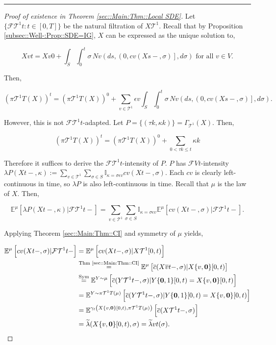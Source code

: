 \documentclass[12pt]{article}
\newcommand{\mb}{\mathbb}
\newcommand{\mc}{\mathcal}
\newcommand{\ov}{\overline}
\newcommand{\os}{\overset}
\newcommand{\te}{\text}
\newcommand{\ep}{\epsilon}
\newcommand{\lin}{\rule{\linewidth}{0.4 pt}}
\newcommand{\exmu}[2]{\mb{E}^{#1}\left[#2\right]}	%
\renewcommand{\root}{\mathbf{0}}				%
\renewcommand{\v}{v}							%
\renewcommand{\S}{S}							%
\newcommand{\s}{\sigma}							%
\newcommand{\ev}{\ep}							%
\newcommand{\T}{T}								%
\renewcommand{\t}{t}							%
\newcommand{\proj}{\pi}							%
\renewcommand{\tt}{s}							%
\newcommand{\F}{\mc{F}}							%
\newcommand{\X}{X}								%
\newcommand{\IGr}{c}							%
\newcommand{\cl}{\ov}							%
\newcommand{\IGrg}{\ov{c}}						%
\newcommand{\tree}{\mc{T}}						%
\newcommand{\sln}[1]{^{#1}}						%
\newcommand{\poiss}{N}							%
\newcommand{\rate}{\lambda}						%
\newcommand{\alt}[1]{\widetilde{#1}}			%
\newcommand{\m}{\mu}							%
\newcommand{\cm}{\gamma}						%
\newcommand{\XX}{Y}								%
\newcommand{\rt}{\tau}							%
\renewcommand{\it}{k}							%
\newcommand{\pmap}[1]{\Gamma_{#1}}				%
\renewcommand{\mark}{\kappa}					%
\newcommand{\rp}{P}								%
\newcommand{\crate}{\alt{\lambda}}				%
\begin{document}
\lin

\begin{proof}[Proof of existence in Theorem \ref{sec::Main:Thm::Local SDE}]

Let \(\{\F{\tree\sln{1}}{\t}:\t\in [0,\T]\}\) be the natural filtration of \(\X{\tree\sln{1}}{}\). Recall that by Proposition \ref{subsec::Well-:Prop::SDE=IG}, \(\X{}{}\) can be expressed as the unique solution to,

\[\X{\v}{\t} = \X{\v}{0} + \int_\S\int_0^\t \s\,\poiss{\v}\left(d\tt,\left(0,c{\v}(\X{}{\tt-},\s)\right],d\s\right) \te{ for all } \v \in  V.\]

Then,

\[\left(\proj{\tree\sln{1}}{\T}(\X{}{})\right)^\t = \left(\proj{\tree\sln{1}}{\T}(\X{}{})\right)^0 + \sum_{\v \in \tree\sln{1}}\ev{\v}\int_\S\int_0^\t \s\,\poiss{\v}\left(d\tt,\left(0,\IGr{\v}(\X{}{\tt-},\s)\right],d\s\right).\]

However, this is not \(\F{\tree\sln{1}}{\t}\)-adapted. Let \(\rp{} = \{(\rt{\it},\mark{\it})\} = \pmap{\tree\sln{1}}(\X{}{}).\) Then,

\[\left(\proj{\tree\sln{1}}{\T}(\X{}{})\right)^\t = \left(\proj{\tree\sln{1}}{\T}(\X{}{})\right)^0 + \sum_{0 < \rt{\it} \leq t}\mark{\it}\]

Therefore it suffices to derive the \(\F{\tree\sln{1}}{\t}\)-intensity of \(\rp{}\). \(\rp{}\) has \(\F{ V}{\t}\)-intensity \(\rate{\rp{}}(\X{}{\t-},\mark{}) := \sum_{\v \in \tree^1}\sum_{\s\in S}\mb{I}_{\mark{} = \s\ev{\v}}\IGr{\v}(\X{}{\t-},\s)\). Each \(\IGr{\v}\) is clearly left-continuous in time, so \(\rate{\rp{}}\) is also left-continuous in time. Recall that \(\m{}{}{}\) is the law of \(\X{}{}\). Then,

\[\exmu{\m{}{}{}}{\rate{\rp{}}(\X{}{\t-},\mark{})|\F{\tree\sln{1}}{\t-}} = \sum_{\v \in \tree\sln{1}}\sum_{\s\in S} \mb{I}_{\mark{} = \s\ev{\v}}\exmu{\m{}{}{}}{\IGr{\v}(\X{}{\t-},\s)|\F{\tree\sln{1}}{\t-}}.\]

Applying Theorem \ref{sec::Main:Thm::CI} and symmetry of \(\m{}{}{}\) yields,

\begin{align*}
\exmu{\m{}{}{}}{\IGr{\v}(\X{}{\t-},\s)|\F{\tree\sln{1}}{\t-}} &= \exmu{\m{}{}{}}{\IGr{\v}(\X{}{\t-},\s)|\X{\tree\sln{1}}{[0,\t)}}\\
&\os{\te{Thm \ref{sec::Main:Thm::CI}}}{=} \exmu{\m{}{}{}}{\IGrg{}(\X{\cl{\v}}{\t-},\s)|\X{\{\v,\root\}}{[0,\t)}} \\
&\os{\te{Sym}}{=} \exmu{\XX{}{}\sim \m{}{}{}}{\IGrg{}(\XX{\tree\sln{1}}{\t-},\s)|\XX{\{\root,1\}}{[0,\t)} = \X{\{\v,\root\}}{[0,\t)}}\\
&= \exmu{\XX{}{}\sim \proj{\tree\sln{1}}{\T}(\m{}{}{})}{\IGrg{}(\XX{\tree\sln{1}}{\t-},\s)|\XX{\{\root,1\}}{[0,\t)} = \X{\{\v,\root\}}{[0,\t)}}\\
&= \exmu{\cm_\t\left(\X{\{\v,\root\}}{[0,\t)},\proj{\tree\sln{1}}{\T}(\m{}{}{})\right)}{\IGrg{}(\X{\tree\sln{1}}{\t-},\s)}\\
&=\crate{}{}(\X{\{\v,\root\}}{[0,\t)},\s) = \crate{\v}{\t}(\s).
\end{align*}


\end{proof}
\end{document}
